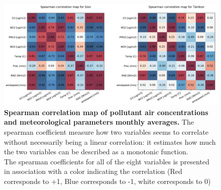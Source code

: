 \documentclass[a4paper, 12pt]{article}
\begin{document}
    \begin{figure}[t]
        \centering
        \includegraphics[width = 1 \textwidth]{Figures/monthly_corr.png}
        \caption{\textbf{Spearman correlation map of pollutant air concentrations and meteorological parameters monthly averages.} The spearman coefficient measure how two variables seems to correlate without necessarily being a linear correlation: it estimates how much the two variables can be described as a monotonic function. \\ The spearman coefficients for all of the eight variables is presented in association with a color indicating the correlation (Red corresponds to +1, Blue corresponds to -1, white corresponds to 0)}
        \label{monthly_corr}
    \end{figure}
    
\end{document}
